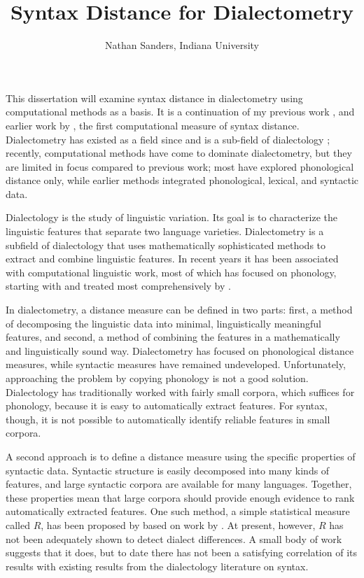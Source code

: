 \documentclass[11pt,letterpaper]{article}
\author{Nathan Sanders, Indiana University}
\title{Syntax Distance for Dialectometry}
\begin{document}
\maketitle

This dissertation will examine syntax distance in dialectometry using
computational methods as a basis. It is a continuation of my previous
work \cite{sanders07}, \cite{sanders08b} and earlier work by
, the first computational measure of syntax
distance. Dialectometry has existed as a field since
 and is a sub-field of dialectology
\cite{chambers98}; recently, computational methods have come to
dominate dialectometry, but they are limited in focus compared to
previous work; most have explored phonological distance only, while
earlier methods integrated phonological, lexical, and syntactic data.

Dialectology is the study of linguistic variation.
Its goal is to characterize the linguistic features that separate two
language varieties. Dialectometry is a subfield of dialectology that
uses mathematically sophisticated methods to extract and combine
linguistic features. In recent years it has been associated with
computational linguistic work, most of which has focused on
phonology, starting with  and treated most
comprehensively by .

In dialectometry, a distance measure can be defined in two parts:
first, a method of decomposing the linguistic data into minimal,
linguistically meaningful features, and second, a method of combining
the features in a mathematically and linguistically sound way.
Dialectometry has focused on phonological distance measures, while
syntactic measures have remained undeveloped. Unfortunately,
approaching the problem by copying phonology is not a good solution.
Dialectology has traditionally worked with fairly small
corpora, which suffices for phonology, because it is easy to
automatically extract features. For syntax, though, it is not possible to
automatically identify reliable features in small corpora.


A second approach is to define a distance measure using the specific
properties of syntactic data. Syntactic structure is easily decomposed
into many kinds of features, and large syntactic corpora are available
for many languages. Together, these properties mean that large corpora
should provide enough evidence to rank automatically extracted
features. One such method, a simple statistical measure called $R$,
has been proposed by  based on work by
. At present, however, $R$ has not been adequately
shown to detect dialect differences. A small body of work suggests
that it does, but to date there has not been a satisfying correlation
of its results with existing results from the dialectology literature
on syntax.
\end{document}
